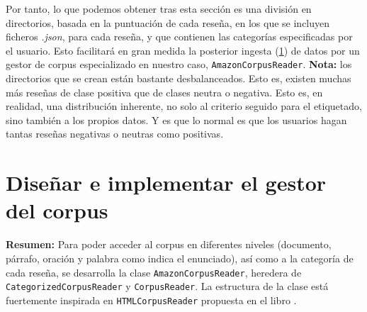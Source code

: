 \documentclass[10pt,a4paper]{article}
\begin{document}
\noindent Por tanto, lo que podemos obtener tras esta sección es una división en directorios, basada en la puntuación de cada reseña, 
en los que se incluyen ficheros \textit{.json}, para cada reseña, y que contienen las categorías especificadas por el usuario. Esto
facilitará en gran medida la posterior ingesta (\ref{sec-2}) de datos por un gestor de corpus especializado en nuestro caso, 
\texttt{AmazonCorpusReader}. \textbf{Nota:} los directorios que se crean están bastante desbalanceados. Esto es, existen muchas más 
reseñas de clase positiva que de clases neutra o negativa. Esto es, en realidad, una distribución inherente, no solo al criterio 
seguido para el etiquetado, sino también a los propios datos. Y es que lo normal es que los usuarios hagan tantas reseñas negativas 
o neutras como positivas. 

\newpage

\section{Diseñar e implementar el gestor del corpus}
\label{sec-2}

\noindent \textbf{Resumen:} Para poder acceder al corpus en diferentes niveles (documento, párrafo, oración y 
palabra como indica el enunciado), así como a la categoría de cada reseña, se desarrolla la clase 
\texttt{AmazonCorpusReader}, heredera de \texttt{CategorizedCorpusReader} y \texttt{CorpusReader}. 
La estructura de la clase está fuertemente inspirada en \texttt{HTMLCorpusReader} propuesta en el libro \cite{bengfort2018}.
\end{document}
